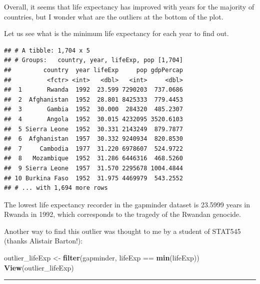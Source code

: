 \documentclass[]{article}
\newenvironment{Shaded}{\begin{snugshade}}{\end{snugshade}}
\newcommand{\KeywordTok}[1]{\textcolor[rgb]{0.13,0.29,0.53}{\textbf{{#1}}}}
\newcommand{\StringTok}[1]{\textcolor[rgb]{0.31,0.60,0.02}{{#1}}}
\newcommand{\NormalTok}[1]{{#1}}
\begin{document}
Overall, it seems that life expectancy has improved with years for the
majority of countries, but I wonder what are the outliers at the bottom
of the plot.

Let us see what is the minimum life expectancy for each year to find
out.

\begin{Shaded}
\end{Shaded}

\begin{verbatim}
## # A tibble: 1,704 x 5
## # Groups:   country, year, lifeExp, pop [1,704]
##         country  year lifeExp     pop gdpPercap
##          <fctr> <int>   <dbl>   <int>     <dbl>
##  1       Rwanda  1992  23.599 7290203  737.0686
##  2  Afghanistan  1952  28.801 8425333  779.4453
##  3       Gambia  1952  30.000  284320  485.2307
##  4       Angola  1952  30.015 4232095 3520.6103
##  5 Sierra Leone  1952  30.331 2143249  879.7877
##  6  Afghanistan  1957  30.332 9240934  820.8530
##  7     Cambodia  1977  31.220 6978607  524.9722
##  8   Mozambique  1952  31.286 6446316  468.5260
##  9 Sierra Leone  1957  31.570 2295678 1004.4844
## 10 Burkina Faso  1952  31.975 4469979  543.2552
## # ... with 1,694 more rows
\end{verbatim}

The lowest life expectancy recorder in the gapminder dataset is 23.5999
years in Rwanda in 1992, which corresponds to the tragedy of the Rwandan
genocide.

Another way to find this outlier was thought to me by a student of
STAT545 (thanks Alistair Barton!):

\begin{Shaded}
\begin{Highlighting}[]
\NormalTok{outlier_lifeExp <-}\StringTok{ }\KeywordTok{filter}\NormalTok{(gapminder, lifeExp ==}\StringTok{ }\KeywordTok{min}\NormalTok{(lifeExp))}
\KeywordTok{View}\NormalTok{(outlier_lifeExp)}
\end{Highlighting}
\end{Shaded}

\begin{center}\rule{0.5\linewidth}{\linethickness}\end{center}
\end{document}
